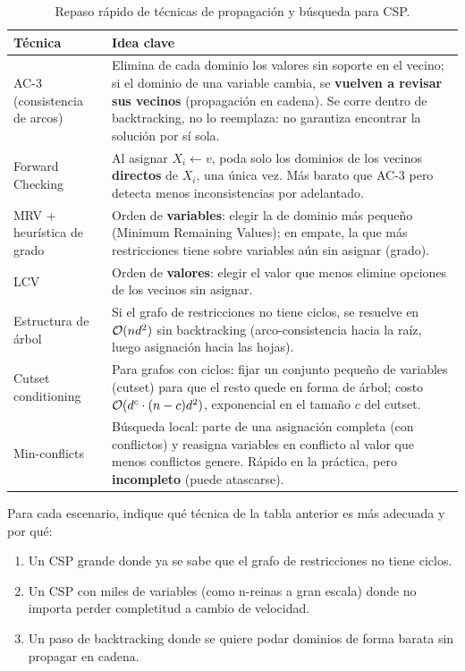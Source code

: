 \begin{table}[H]
    \centering
    \begin{tabular}{lp{9cm}}
        \toprule
        Técnica & Idea clave \\
        \midrule
        AC-3 (consistencia de arcos) & Elimina de cada dominio los valores sin soporte en el vecino; si el dominio de
        una variable cambia, se \textbf{vuelven a revisar sus vecinos} (propagación en cadena). Se corre dentro de
        backtracking, no lo reemplaza: no garantiza encontrar la solución por sí sola. \\
        Forward Checking & Al asignar $X_i \leftarrow v$, poda solo los dominios de los vecinos \textbf{directos} de
        $X_i$, una única vez. Más barato que AC-3 pero detecta menos inconsistencias por adelantado. \\
        MRV + heurística de grado & Orden de \textbf{variables}: elegir la de dominio más pequeño (Minimum Remaining
        Values); en empate, la que más restricciones tiene sobre variables aún sin asignar (grado). \\
        LCV & Orden de \textbf{valores}: elegir el valor que menos elimine opciones de los vecinos sin asignar. \\
        Estructura de árbol & Si el grafo de restricciones no tiene ciclos, se resuelve en $\mathcal{O}(nd^2)$ sin
        backtracking (arco-consistencia hacia la raíz, luego asignación hacia las hojas). \\
        Cutset conditioning & Para grafos con ciclos: fijar un conjunto pequeño de variables (cutset) para que el
        resto quede en forma de árbol; costo $\mathcal{O}(d^c\cdot(n-c)d^2)$, exponencial en el tamaño $c$ del cutset. \\
        Min-conflicts & Búsqueda local: parte de una asignación completa (con conflictos) y reasigna variables en
        conflicto al valor que menos conflictos genere. Rápido en la práctica, pero \textbf{incompleto} (puede
        atascarse). \\
        \bottomrule
    \end{tabular}
    \caption{Repaso rápido de técnicas de propagación y búsqueda para CSP.}
\end{table}

\begin{exercise}
    Para cada escenario, indique qué técnica de la tabla anterior es más adecuada y por qué:
    \begin{enumerate}
        \item Un CSP grande donde ya se sabe que el grafo de restricciones no tiene ciclos.
        \item Un CSP con miles de variables (como n-reinas a gran escala) donde no importa perder completitud a cambio
        de velocidad.
        \item Un paso de backtracking donde se quiere podar dominios de forma barata sin propagar en cadena.
    \end{enumerate}
\end{exercise}

